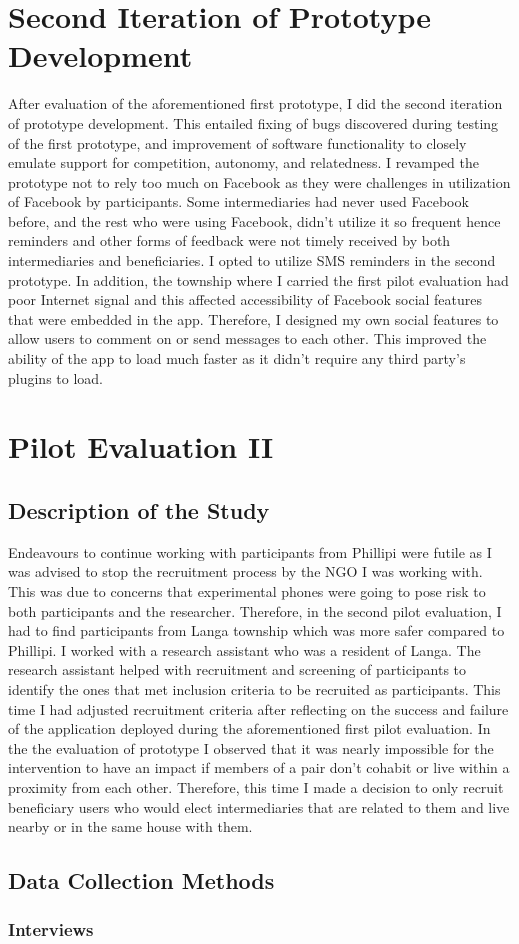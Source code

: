 \section{Second Iteration of Prototype Development}
After evaluation of the aforementioned first prototype, I did the second iteration of prototype development. This entailed fixing of bugs discovered during testing of the first prototype, and improvement of software functionality to closely emulate support for competition, autonomy, and relatedness. I revamped the prototype not to rely too much on Facebook as they were challenges in utilization of Facebook by participants. Some intermediaries had never used Facebook before, and the rest who were using Facebook, didn't utilize it so frequent hence reminders and other forms of feedback were not timely received by both intermediaries and beneficiaries. I opted to utilize SMS reminders in the second prototype. In addition, the township where I carried the first pilot evaluation had poor Internet signal and this affected accessibility of Facebook social features that were embedded in the app. Therefore, I designed my own social features to allow users to comment on or send messages to each other. This improved the ability of the app to load much faster as it didn't require any third party's plugins to load.
\section{Pilot Evaluation II} 
\subsection{Description of the Study}
Endeavours to continue working with participants from Phillipi were futile as I was advised to stop the recruitment process by the NGO I was working with. This was due to concerns that experimental phones were going to pose risk to both participants and the researcher. Therefore, in the second pilot evaluation, I had to find participants from Langa township which was more safer compared to Phillipi. I worked with a research assistant who was a resident of Langa. The research assistant helped with recruitment and screening of participants to identify the ones that met inclusion criteria to be recruited as participants. This time I had adjusted recruitment criteria after reflecting on the success and failure of the application deployed during the aforementioned first pilot evaluation. In the the evaluation of prototype I observed that it was nearly impossible for the intervention to have an impact if members of a pair don't cohabit or live within a proximity from each other. Therefore, this time I made a decision to only recruit beneficiary users who would elect intermediaries that are related to them and live nearby or in the same house with them. 
\subsection{Data Collection Methods}
\subsubsection{Interviews}

\begin{flushright}
\end{flushright}
